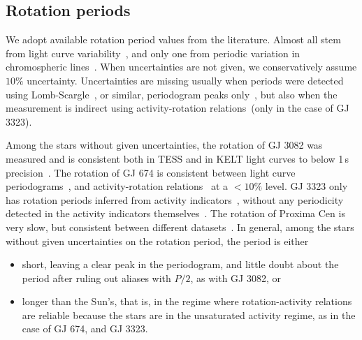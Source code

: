 \documentclass[twocolumn]{aastex631}
\begin{document}
\subsection{Rotation periods}
\label{sec:data:rotationperiods}
We adopt available rotation period values from the literature. Almost all stem from light curve variability~\citep{angus2018inferring, mazeh2015photometric, mcquillan2013stellar, mcquillan2014rotation, luger2017sevenplanet, stock2020carmenes, deleon202137, torres2017validation, stefansson2020habitable, zicher2022one, ment2021toi, rizzuto2020tess, gunther2020stellar}, and only one from periodic variation in chromospheric lines~\citep{demangeon2021warm}. When uncertainties are not given, we conservatively assume $10\%$ uncertainty. Uncertainties are missing usually when periods were detected using Lomb-Scargle~\citep{lomb1976leastsquares, scargle1982studies}, or similar, periodogram peaks only~\citep{gunther2020stellar, kiraga2007agerotationactivity, grankin2013magnetically, burt2014lickcarnegie}, but also when the measurement is indirect using activity-rotation relations~(only in the case of GJ 3323).

Among the stars without given uncertainties, the rotation of GJ 3082 was measured and is consistent both in TESS and in KELT light curves to below 1\,s precision~\citep{gunther2020stellar}. The rotation of GJ 674 is consistent between light curve periodograms~\citep{kiraga2007agerotationactivity}, and activity-rotation relations~\citep{boisse2011disentangling} at a $<10\%$ level. GJ 3323 only has rotation periods inferred from activity indicators~\citep{astudillo-defru2017magnetic}, without any periodicity detected in the activity indicators themselves~\citep{astudillo-defru2017harps}. The rotation of Proxima Cen is very slow, but consistent between different datasets~\citep{anglada-escude2016terrestrial, kiraga2007agerotationactivity}. In general, among the stars without given uncertainties on the rotation period, the period is either 
\begin{itemize}
    \item short, leaving a clear peak in the periodogram, and little doubt about the period after ruling out aliases with $P/2$, as with GJ 3082, or
    \item longer than the Sun's, that is, in the regime where rotation-activity relations are reliable because the stars are in the unsaturated activity regime, as in the case of GJ 674, and GJ 3323.
\end{itemize} 
\end{document}

